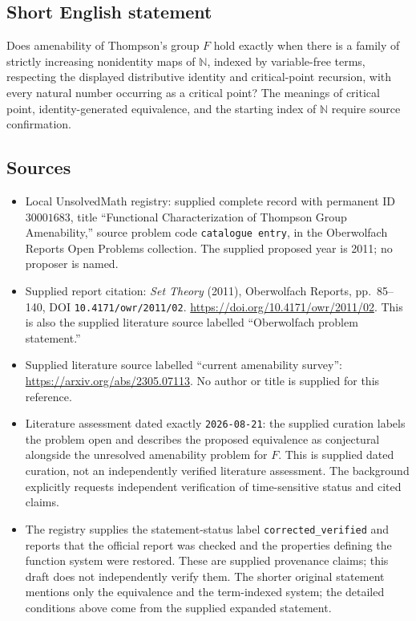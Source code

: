 \documentclass[11pt]{article}
\newcommand{\N}{\mathbb{N}}
\begin{document}
\subsection{Short English statement}
Does amenability of Thompson's group $F$ hold exactly when there is a family of strictly increasing nonidentity maps of $\N$, indexed by variable-free terms, respecting the displayed distributive identity and critical-point recursion, with every natural number occurring as a critical point? The meanings of critical point, identity-generated equivalence, and the starting index of $\N$ require source confirmation.
\subsection{Sources}
\begin{itemize}
\item Local UnsolvedMath registry: supplied complete record with permanent ID $30001683$, title ``Functional Characterization of Thompson Group Amenability,'' source problem code \texttt{catalogue entry}, in the Oberwolfach Reports Open Problems collection. The supplied proposed year is 2011; no proposer is named.
\item Supplied report citation: \emph{Set Theory} (2011), Oberwolfach Reports, pp.~85--140, DOI \texttt{10.4171/owr/2011/02}. \url{https://doi.org/10.4171/owr/2011/02}. This is also the supplied literature source labelled ``Oberwolfach problem statement.''
\item Supplied literature source labelled ``current amenability survey'': \url{https://arxiv.org/abs/2305.07113}. No author or title is supplied for this reference.
\item Literature assessment dated exactly \texttt{2026-08-21}: the supplied curation labels the problem open and describes the proposed equivalence as conjectural alongside the unresolved amenability problem for $F$. This is supplied dated curation, not an independently verified literature assessment. The background explicitly requests independent verification of time-sensitive status and cited claims.
\item The registry supplies the statement-status label \texttt{corrected\_verified} and reports that the official report was checked and the properties defining the function system were restored. These are supplied provenance claims; this draft does not independently verify them. The shorter original statement mentions only the equivalence and the term-indexed system; the detailed conditions above come from the supplied expanded statement.
\end{itemize}
\end{document}
